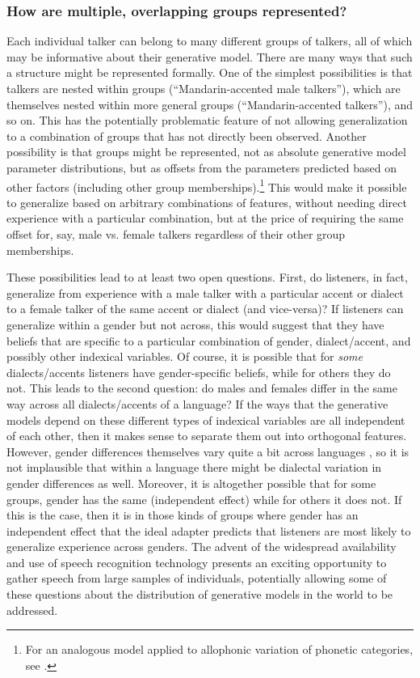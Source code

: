 \subsubsection{How are multiple, overlapping groups represented?}
\label{sec:what-repr-are}

\label{r1-features-classes}
Each individual talker can belong to many different groups of talkers, all of which may be informative about their generative model.  There are many ways that such a structure might be represented formally.  One of the simplest possibilities is that talkers are nested within groups (``Mandarin-accented male talkers''), which are themselves nested within more general groups (``Mandarin-accented talkers''), and so on.  This has the potentially problematic feature of not allowing generalization to a combination of groups that has not directly been observed.  Another possibility is that groups might be represented, not as absolute generative model parameter distributions, but as offsets from the parameters predicted based on other factors (including other group memberships).\footnote{For an analogous model applied to allophonic variation of phonetic categories, see .}  This would make it possible to generalize based on arbitrary combinations of features, without needing direct experience with a particular combination, but at the price of requiring the same offset for, say, male vs. female talkers regardless of their other group memberships.  

These possibilities lead to at least two open questions. First, do listeners, in fact, generalize from experience with a male talker with a particular accent or dialect to a female talker of the same accent or dialect (and vice-versa)?  If listeners can generalize within a gender but not across, this would suggest that they have beliefs that are specific to a particular combination of gender, dialect/accent, and possibly other indexical variables.  Of course, it is possible that for \emph{some} dialects/accents listeners have gender-specific beliefs, while for others they do not.  This leads to the second question: do males and females differ in the same way across all dialects/accents of a language?  If the ways that the generative models depend on these different types of indexical variables are all independent of each other, then it makes sense to separate them out into orthogonal features.  However, gender differences themselves vary quite a bit across languages \cite{Johnson2006}, so it is not implausible that within a language there might be dialectal variation in gender differences as well.  Moreover, it is altogether possible that for some groups, gender has the same (independent effect) while for others it does not.  If this is the case, then it is in those kinds of groups where gender has an independent effect that the ideal adapter predicts that listeners are most likely to generalize experience across genders. The advent of the widespread availability and use of speech recognition technology presents an exciting opportunity to gather speech from large samples of individuals, potentially allowing some of these questions about the distribution of generative models in the world to be addressed.

